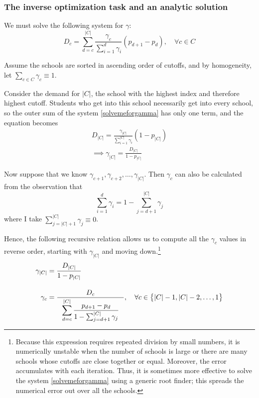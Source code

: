 \documentclass[12pt]{article}
\theoremstyle{definition}
\begin{document}
\subsubsection{The inverse optimization task and an analytic solution}
We must solve the following system for $\gamma$:
\begin{equation}
D_c = \sum_{d=c}^{|C|} 
\frac{\gamma_c}{ \sum_{i=1}^d \gamma_i} 
\left(p_{d+1} - p_{d}\right),
\quad \forall c \in C
 \label{solvemeforgamma}
 \end{equation}

Assume the schools are sorted in ascending order of cutoffs, and by homogeneity, let $\sum_{c \in C} \gamma_c \equiv 1$.

Consider the demand for $|C|$, the school with the highest index and therefore highest cutoff. Students who get into this school necessarily get into every school, so the outer sum of the system \eqref{solvemeforgamma} has only one term, and the equation becomes
\begin{align}D_{|C|} =
\frac{\gamma_{|C|}}{ \sum_{i=1}^{|C|} \gamma_i} 
\left(1 - p_{|C|}\right) \\
\implies \gamma_{|C|} = \frac{D_{|C|}}{1 - p_{|C|}}
\end{align}

Now suppose that we know $\gamma_{c+1}, \gamma_{c+2}, \dots, \gamma_{|C|}$. Then $\gamma_c$ can also be calculated from the observation that
\[\sum_{i=1}^d \gamma_i = 1 - \sum_{j=d+1}^{|C|} \gamma_j\]
where I take $\sum_{j=|C|+1}^{|C|} \gamma_j \equiv 0$.

Hence, the following recursive relation allows us to compute all the $\gamma_c$ values in reverse order, starting with $\gamma_{|C|}$ and moving down.\footnote{Because this expression requires repeated division by small numbers, it is numerically unstable when the number of schools is large or there are many schools whose cutoffs are close together or equal. Moreover, the error accumulates with each iteration. Thus, it is sometimes more effective to solve the system \eqref{solvemeforgamma} using a generic root finder; this spreads the numerical error out over all the schools.} 
\begin{align}
\gamma_{|C|} &= \frac{D_{|C|}}{1 - p_{|C|}} \\[1em]
\gamma_c &= \frac{D_c}{~~\mathlarger{\sum_{d=c}^{|C|} \frac{p_{d+1} - p_d}{1 - \sum_{j=d+1}^{|C|} \gamma_j} ~~}}, \quad \forall c \in \bigl\{ |C|-1, |C|-2, \dots, 1\bigr\} \label{gammarecursion}
\end{align}
\end{document}
